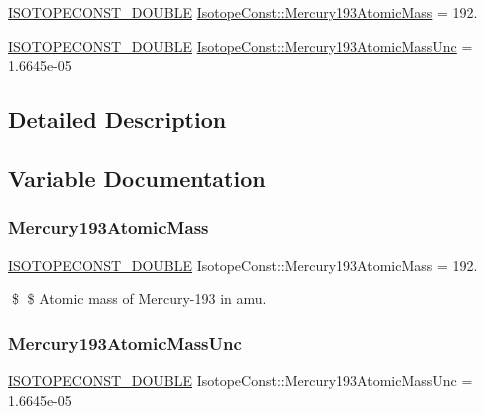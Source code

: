\begin{DoxyCompactItemize}
\item 
\mbox{\hyperlink{group___isotope_const-_macros_ga8f45a7272ce02c0b4c65c44636ed719a}{I\+S\+O\+T\+O\+P\+E\+C\+O\+N\+S\+T\+\_\+\+D\+O\+U\+B\+LE}} \mbox{\hyperlink{group___isotope_const-_mercury-_hg193_ga08b94006a281db427745c5727d1e18d7}{Isotope\+Const\+::\+Mercury193\+Atomic\+Mass}} = 192.
\item 
\mbox{\hyperlink{group___isotope_const-_macros_ga8f45a7272ce02c0b4c65c44636ed719a}{I\+S\+O\+T\+O\+P\+E\+C\+O\+N\+S\+T\+\_\+\+D\+O\+U\+B\+LE}} \mbox{\hyperlink{group___isotope_const-_mercury-_hg193_gab4ec1822764b1ea50454b77174fff232}{Isotope\+Const\+::\+Mercury193\+Atomic\+Mass\+Unc}} = 1.\+6645e-\/05
\end{DoxyCompactItemize}


\subsection{Detailed Description}


\subsection{Variable Documentation}
\mbox{\label{group___isotope_const-_mercury-_hg193_ga08b94006a281db427745c5727d1e18d7}} 
\subsubsection{\texorpdfstring{Mercury193\+Atomic\+Mass}{Mercury193AtomicMass}}
{\footnotesize\ttfamily \mbox{\hyperlink{group___isotope_const-_macros_ga8f45a7272ce02c0b4c65c44636ed719a}{I\+S\+O\+T\+O\+P\+E\+C\+O\+N\+S\+T\+\_\+\+D\+O\+U\+B\+LE}} Isotope\+Const\+::\+Mercury193\+Atomic\+Mass = 192.}

\$ \$ Atomic mass of Mercury-\/193 in amu. \mbox{\label{group___isotope_const-_mercury-_hg193_gab4ec1822764b1ea50454b77174fff232}} 
\subsubsection{\texorpdfstring{Mercury193\+Atomic\+Mass\+Unc}{Mercury193AtomicMassUnc}}
{\footnotesize\ttfamily \mbox{\hyperlink{group___isotope_const-_macros_ga8f45a7272ce02c0b4c65c44636ed719a}{I\+S\+O\+T\+O\+P\+E\+C\+O\+N\+S\+T\+\_\+\+D\+O\+U\+B\+LE}} Isotope\+Const\+::\+Mercury193\+Atomic\+Mass\+Unc = 1.\+6645e-\/05}

